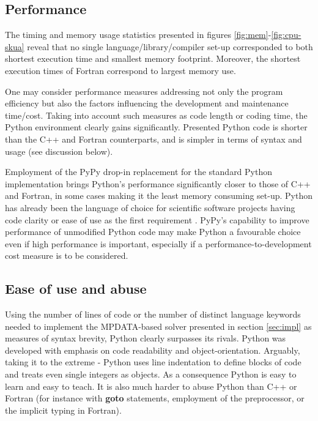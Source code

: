 \documentclass[final,5p,times,twocolumn]{elsarticle}
\newcommand{\prog}[1]{{\rm\bf#1}}
\begin{document}
  \subsection{Performance}
  
  The timing and memory usage statistics presented in figures \ref{fig:mem}-\ref{fig:cpu-skua}
    reveal that no single language/library/compiler set-up 
    corresponded to both shortest execution time and smallest memory footprint.
  Moreover, the shortest execution times of Fortran correspond to largest memory use.

  One may consider performance measures addressing not only the program efficiency but also 
    the factors influencing the development and maintenance time/cost.
  Taking into account such measures as code length or coding time,
    the Python environment clearly gains significantly.
  Presented Python code is shorter than the C++ and Fortran counterparts,
    and is simpler in terms of syntax and usage (see discussion below).

  Employment of the PyPy drop-in replacement for the standard Python implementation brings 
    Python's performance significantly closer to those of C++ and Fortran, in some
    cases making it the least memory consuming set-up.
  Python has already been the language of choice for scientific software projects having code clarity 
    or ease of use as the first requirement \citep[see e.g.][]{Barnes_and_Jones_2011}.
  PyPy's capability to improve performance of unmodified Python code may 
    make Python a favourable choice even if high performance is important, especially
    if a performance-to-development cost measure is to be considered. 

  \subsection{Ease of use and abuse}

  Using the number of lines of code or the number of distinct language keywords
    needed to implement the MPDATA-based
    solver presented in section \ref{sec:impl} as measures of syntax 
    brevity, Python clearly surpasses its rivals.
  Python was developed with emphasis on code readability and object-orientation.
  Arguably, taking it to the extreme - Python uses line indentation to define 
    blocks of code and treats even single integers as objects.
  As a consequence Python is easy to learn and easy to teach.
  It is also much harder to abuse Python than C++ or Fortran
    (for instance with \prog{goto} statements, employment of the preprocessor,
    or the implicit typing in Fortran).
\end{document}

